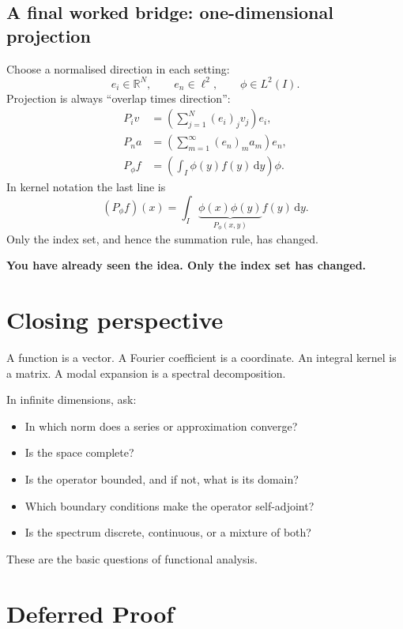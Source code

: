 \documentclass[11pt,a5paper,oneside,openany]{scrreprt}
\theoremstyle{notes}
\theoremstyle{definitions}
\newcommand{\R}{\mathbb{R}}
\newcommand{\dd}{\,\mathrm{d}}
\begin{document}
\section*{A final worked bridge: one-dimensional projection}

Choose a normalised direction in each setting:
\[
 e_i\in\R^N,
 \qquad e_n\in\ell^2,
 \qquad \phi\in L^2(I).
\]
Projection is always ``overlap times direction'':
\[
 \begin{aligned}
 P_iv
   &=\left(\sum_{j=1}^{N}(e_i)_jv_j\right)e_i,\\[1mm]
 P_na
   &=\left(\sum_{m=1}^{\infty}(e_n)_ma_m\right)e_n,\\[1mm]
 P_\phi f
   &=\left(\int_I\phi(y)f(y)\dd y\right)\phi.
 \end{aligned}
\]
In kernel notation the last line is
\[
 (P_\phi f)(x)=\int_I\underbrace{\phi(x)\phi(y)}_{P_\phi(x,y)}f(y)\dd y.
\]
Only the index set, and hence the summation rule, has changed.

\begin{summarybox}
\centering
\sffamily\bfseries\large
You have already seen the idea.  Only the index set has changed.
\end{summarybox}

\chapter*{Closing perspective}

A function is a vector.  A Fourier coefficient is a coordinate.  An integral
kernel is a matrix.  A modal expansion is a spectral decomposition.

In infinite dimensions, ask:
\begin{itemize}
  \item In which norm does a series or approximation converge?
  \item Is the space complete?
  \item Is the operator bounded, and if not, what is its domain?
  \item Which boundary conditions make the operator self-adjoint?
  \item Is the spectrum discrete, continuous, or a mixture of both?
\end{itemize}
These are the basic questions of functional analysis.

\appendix
\chapter{Deferred Proof}
\label{appendix:norm-equivalence}
\end{document}
